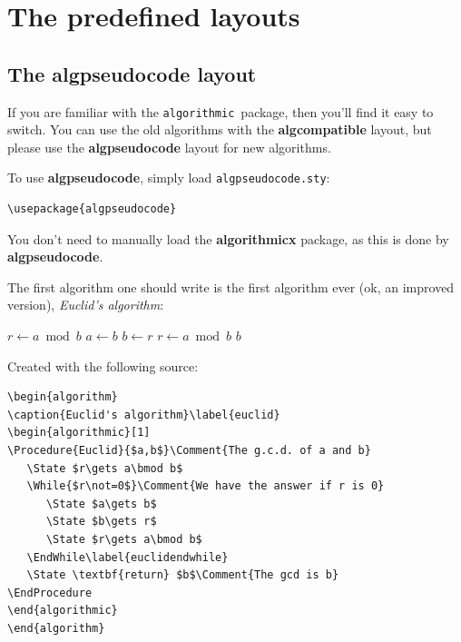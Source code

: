 \documentclass{article}
\newcommand{\old}{\texttt{algorithmic}}
\newcommand{\euk}{Euclid}
\begin{document}
\section{The predefined layouts}

\subsection{The \textbf{algpseudocode} layout}\label{algpseudocode}
If you are familiar with the \old\ package, then you'll find it easy to 
switch. You can use the old algorithms with the \textbf{algcompatible} layout, but please
use the \textbf{algpseudocode} layout for new algorithms.

To use \textbf{algpseudocode}, simply load \verb:algpseudocode.sty::

\begin{verbatim}
\usepackage{algpseudocode}
\end{verbatim}

You don't need to manually load the \textbf{algorithmicx} package, as this is done by
\textbf{algpseudocode}.

The first algorithm one should write is the first algorithm ever (ok, 
an improved version), \textit{\euk's algorithm}:

\begin{algorithm}[H]
\caption{\euk's algorithm}\label{euclid}
\begin{algorithmic}[1]
\Procedure{\euk}{$a,b$}
   \State $r\gets a\bmod b$
      \State $a\gets b$
      \State $b\gets r$
      \State $r\gets a\bmod b$
   \EndWhile\label{euclidendwhile}
   \State \Return $b$
\EndProcedure
\end{algorithmic}
\end{algorithm}

Created with the following source:
\begin{verbatim}
\begin{algorithm}
\caption{Euclid's algorithm}\label{euclid}
\begin{algorithmic}[1]
\Procedure{Euclid}{$a,b$}\Comment{The g.c.d. of a and b}
   \State $r\gets a\bmod b$
   \While{$r\not=0$}\Comment{We have the answer if r is 0}
      \State $a\gets b$
      \State $b\gets r$
      \State $r\gets a\bmod b$
   \EndWhile\label{euclidendwhile}
   \State \textbf{return} $b$\Comment{The gcd is b}
\EndProcedure
\end{algorithmic}
\end{algorithm}
\end{verbatim}
\end{document}
